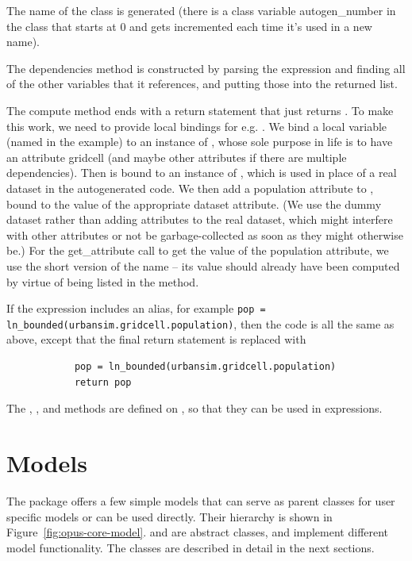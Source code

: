 {The name of the class is generated (there is a class variable
autogen_number in the class  that starts at 0
and gets incremented each time it's used in a new name).

The dependencies method is constructed by parsing the expression and
finding all of the other variables that it references, and putting those
into the returned list.

The compute method ends with a return statement that just returns
.  To make this work, we need to provide local bindings for
e.g. .  We bind a local variable (named
 in the example) to an instance of , whose
sole purpose in life is to have an attribute gridcell (and maybe other
attributes if there are multiple dependencies).  Then
 is bound to an instance of ,
which is used in place of a real dataset in the autogenerated code.  We
then add a population attribute to , bound to the
value of the appropriate dataset attribute.  (We use the dummy dataset
rather than adding attributes to the real dataset, which might interfere
with other attributes or not be garbage-collected as soon as they might
otherwise be.)  For the get_attribute call to get the value of the
population attribute, we use the short version of the name -- its value
should already have been computed by virtue of being listed in the
 method.

If the expression includes an alias, for example
\verb|pop = ln_bounded(urbansim.gridcell.population)|, then the code is all
the same as above, except that the final return statement is replaced with
\begin{verbatim}
            pop = ln_bounded(urbansim.gridcell.population)
            return pop
\end{verbatim}

The , , and 
methods are defined on , so that they can be used in
expressions.

\section{Models} 
\label{sec:opus-core-models}

The  package offers a few simple models that can serve as parent classes
for user specific models or can be used directly. Their hierarchy is shown in
Figure~\ref{fig:opus-core-model}.  and  are abstract
classes,  and  implement different
model functionality. The classes are described in detail in the next sections.

}
